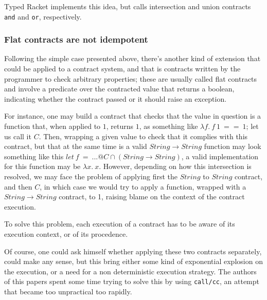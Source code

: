 Typed Racket implements this idea, but calls intersection and union contracts
\texttt{and} and \texttt{or}, respectively.


\subsubsection*{Flat contracts are not idempotent}

Following the simple case presented above, there's another kind of extension that could be
applied to a contract system, and that is contracts written by the
programmer to check arbitrary properties; these are usually called flat contracts and
involve a predicate over the contracted value that returns a boolean, indicating whether
the contract passed or it should raise an exception.

For instance, one may build a contract that checks that the value in question is a
function that, when applied to $1$, returns $1$, as something like
$\lambda f.~f~1~==~1$; let us call it $C$.
Then, wrapping a given value to check that it complies with this contract, but that at
the same time is a valid $String \rightarrow String$ function may look something like this
$let~f~=~...@C \cap (String \rightarrow String)$, a valid implementation for this function
may be $\lambda x.~x$.
However, depending on how this intersection is resolved, we may face the problem of applying first
the $String$ to $String$ contract, and then $C$, in which case we would try to apply a function,
wrapped with a $String \rightarrow String$ contract, to 1, raising blame on the context
of the contract execution.

To solve this problem, each execution of a contract has to be aware of its execution context,
or of its procedence.




Of course, one could ask himself whether applying these two contracts separately,
could make any sense, but this bring either some kind of exponential explosion
on the execution, or a need for a non deterministic execution
strategy.
The authors of this papers spent some time trying to solve this by using
\texttt{call/cc}, an attempt that became too unpractical too rapidly.

